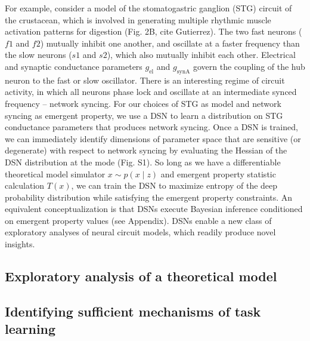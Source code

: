 \documentclass[11pt]{article}
\begin{document}
For example, consider a model of the stomatogastric ganglion (STG) circuit of the crustacean, which is involved in generating multiple rhythmic muscle activation patterns for digestion (Fig. 2B, cite Gutierrez).  The two fast neurons ($f1$ and $f2$) mutually inhibit one another, and oscillate at a faster frequency than the slow neurons ($s1$ and $s2$), which also mutually inhibit each other.  Electrical and synaptic conductance parameters $g_{\text{el}}$ and $g_{\text{synA}}$ govern the coupling of the hub neuron to the fast or slow oscillator.  There is an interesting regime of circuit activity, in which all neurons phase lock and oscillate at an intermediate synced frequency – network syncing.  For our choices of STG as model and network syncing as emergent property, we use a DSN to learn a distribution on STG conductance parameters that produces network syncing.  Once a DSN is trained, we can immediately identify dimensions of parameter space that are sensitive (or degenerate) with respect to network syncing by evaluating the Hessian of the DSN distribution at the mode (Fig. S1).  So long as we have a differentiable theoretical model simulator $x \sim p(x \mid z)$ and emergent property statistic calculation $T(x)$, we can train the DSN to maximize entropy of the deep probability distribution while satisfying the emergent property constraints.  An equivalent conceptualization is that DSNs execute Bayesian inference conditioned on emergent property values (see Appendix).  DSNs enable a new class of exploratory analyses of neural circuit models, which readily produce novel insights.





\subsection{Exploratory analysis of a theoretical model}


\subsection{Identifying sufficient mechanisms of task learning}

\end{document}
